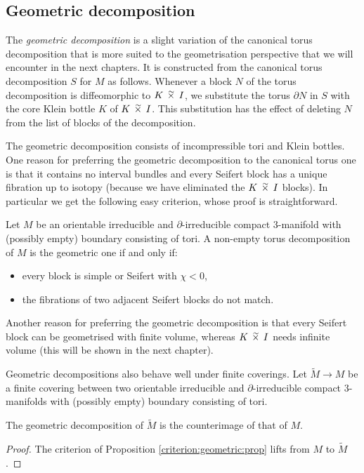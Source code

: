 \subsection{Geometric decomposition} \label{geometric:decomposition:subsection}
The \emph{geometric decomposition} is a slight variation of the canonical torus decomposition that is more suited to the geometrisation perspective that we will encounter in the next chapters. It is constructed from the canonical torus decomposition $S$ for $M$ as follows. Whenever a block $N$ of the torus decomposition is diffeomorphic to $K\timtil I$,  
we substitute the torus $\partial N$ in $S$ with the core Klein bottle $K$ of $K\timtil I$. This substitution has the effect of deleting $N$ from the list of blocks of the decomposition.

The geometric decomposition consists of incompressible tori and Klein bottles. One reason for preferring the geometric decomposition to the canonical torus one is that it contains no interval bundles and every Seifert block has a unique fibration up to isotopy (because we have eliminated the $K\timtil I$ blocks). In particular we get the following easy criterion, whose proof is straightforward. 
\begin{prop} \label{criterion:geometric:prop}
Let  $M$ be an orientable irreducible and $\partial$-irreducible compact 3-manifold with (possibly empty) boundary consisting of tori. 
A non-empty torus decomposition of $M$ is the geometric one if and only if:
\begin{itemize}
\item every block is simple or Seifert with $\chi<0$,
\item the fibrations of two adjacent Seifert blocks do not match.
\end{itemize}
\end{prop}

Another reason for preferring the geometric decomposition is that every Seifert block can be geometrised with finite volume, whereas $K\timtil I$ needs infinite volume (this will be shown in the next chapter). 

Geometric decompositions also behave well under finite coverings. Let $\tilde M \to M$ be a finite covering between two orientable irreducible and $\partial$-irreducible compact 3-manifolds with (possibly empty) boundary consisting of tori. 

\begin{prop} \label{JSJ:lifts:prop}
The geometric decomposition of $\tilde M$ is the counterimage of that of $M$.
\end{prop}
\begin{proof}
The criterion of Proposition \ref{criterion:geometric:prop} lifts from $M$ to $\tilde M$.
\end{proof}

